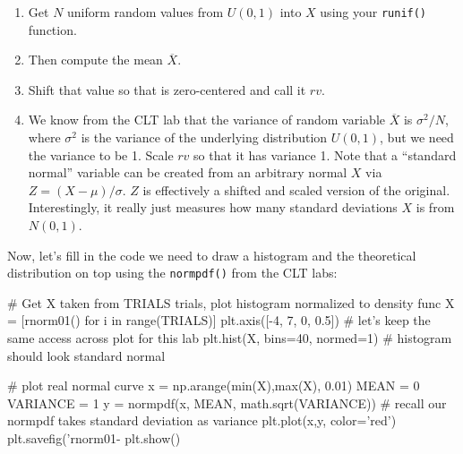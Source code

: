 \begin{fullwidth}
\begin{enumerate}
\item Get $N$ uniform random values from $U(0,1)$ into $X$ using your {\tt runif()} function.
\item Then compute the mean $\overline X$.
\item Shift that value so that is zero-centered and call it $rv$.
\item We know from the CLT lab that the variance of random variable $\overline X$ is $\sigma^2 / N$, where $\sigma^2$ is the variance of the underlying distribution $U(0,1)$, but we need the variance to be 1. Scale $rv$ so that it has variance 1. Note that a ``standard normal'' variable can be created from an arbitrary normal $X$ via $Z = (X-\mu)/\sigma$. $Z$ is effectively a shifted and scaled version of the original.  Interestingly, it really just measures how many standard deviations $X$ is from $N(0,1)$.
\end{enumerate}

\step Now, let's fill in the code we need to draw a histogram and  the theoretical distribution on top using the {\tt normpdf()} from the CLT labs:

\begin{pyverbatim}
# Get X taken from TRIALS trials, plot histogram normalized to density func
X = [rnorm01() for i in range(TRIALS)]
plt.axis([-4, 7, 0, 0.5]) # let's keep the same access across plot for this lab
plt.hist(X, bins=40, normed=1) # histogram should look standard normal

# plot real normal curve
x = np.arange(min(X),max(X), 0.01)
MEAN = 0
VARIANCE = 1
y = normpdf(x, MEAN, math.sqrt(VARIANCE)) # recall our normpdf takes standard deviation as variance
plt.plot(x,y, color='red') 
plt.savefig('rnorm01-%
plt.show()
\end{pyverbatim}



\end{fullwidth}
